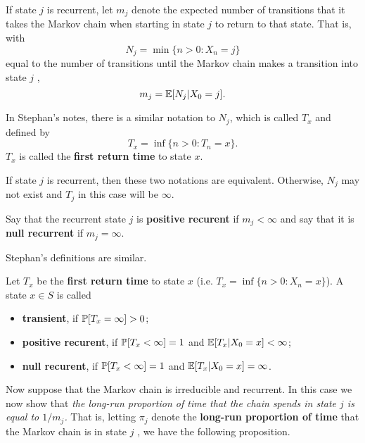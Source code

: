 If state $j$ is recurrent, let $m_j$ denote the expected number of transitions that it takes the Markov chain when starting in state $j$ to return to that state. That is, with
$$
N_j = \min\{n > 0 : X_n = j \}
$$
equal to the number of transitions until the Markov chain makes a transition into
state $j$ ,
$$
m_j = \mathbb{E}[N_j |X_0 = j ].
$$

\begin{remark}
    In Stephan's notes, there is a similar notation to $N_j$, which is called $T_x$ and defined by 
    $$T_x = \inf \{n > 0: T_n = x\}.$$
    $T_x$ is called the \textbf{first return time} to state $x$. 

    If state $j$ is recurrent, then these two notations are equivalent. Otherwise, $N_j$ may not exist and $T_j$ in this case will be $\infty$.
\end{remark}

\begin{definition}
    Say that the recurrent state $j$ is \textbf{positive recurent} if $m_j < \infty$ and say that it is \textbf{null recurrent} if $m_j = \infty$.
\end{definition}

Stephan's definitions are similar. 

\begin{definition}
    Let $T_x$ be the \textbf{first return time} to state $x$ (i.e. $T_x = \inf \{ n > 0: X_n = x\}$). A state $x \in S$ is called 
    \begin{itemize}
        \item \textbf{transient}, if $\mathbb{P}[T_x = \infty] > 0$;
        \item \textbf{positive recurent}, if $\mathbb{P} [T_x < \infty] = 1$ and $\mathbb{E} [T_x | X_0 = x] < \infty$;
        \item \textbf{null recurent}, if $\mathbb{P} [T_x < \infty] = 1$ and $\mathbb{E} [T_x | X_0 = x] = \infty$.
    \end{itemize}
\end{definition}

Now suppose that the Markov chain is irreducible and recurrent. In this case we now show that \textit{the long-run proportion of time that the chain spends in state $j$ is equal to $1/m_j$.} That is, letting $\pi_j$ denote the \textbf{long-run proportion of time} that the Markov chain is in state $j$ , we have the following proposition.

